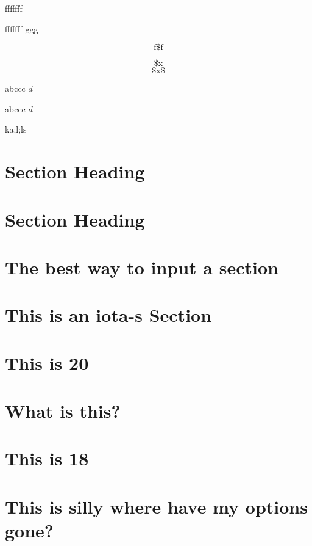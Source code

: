 

fffffff 

fffffff 
ggg

$$
\text{f$\$$f}
$$


$$
\text{$\$$x}
$$
$$
\text{$\$$x$\$$}
$$




abccc $ d $

abccc $ d $



ka;l;ls 



\section{Section Heading }

\section{Section Heading }

\section{The best way to input a section }

\section{This is an iota-s Section }

\section{This is 20 }





\section{What is this? }

\section{This is 18 }

\section{This is silly where have my
options gone? }





